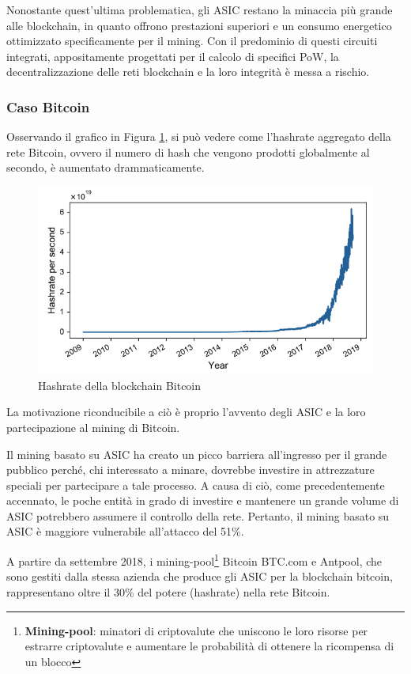 Nonostante quest'ultima problematica, gli ASIC restano la minaccia più grande alle blockchain, in quanto offrono prestazioni superiori e un consumo energetico ottimizzato specificamente per il mining. 
Con il predominio di questi circuiti integrati, appositamente progettati per il calcolo di specifici PoW, la decentralizzazione delle reti blockchain e la loro integrità è messa a rischio. 



\subsubsection{Caso Bitcoin}
Osservando il grafico in Figura \ref{fig:btc-hashrate}, si può vedere come l'hashrate aggregato della rete Bitcoin, ovvero il numero di hash che vengono prodotti globalmente al secondo, è aumentato drammaticamente.

\begin{figure}[h!]
    \centering
    \includegraphics[width=0.55\linewidth]{images/bitcoin_hashrate.png}
    \caption{Hashrate della blockchain Bitcoin \cite{asic1}}
    \label{fig:btc-hashrate}
\end{figure}

La motivazione riconducibile a ciò è proprio l'avvento degli ASIC e la loro partecipazione al mining di Bitcoin.

Il mining basato su ASIC ha creato un picco barriera all'ingresso per il grande pubblico perché, chi interessato a minare, dovrebbe investire in attrezzature speciali per partecipare a tale processo.
A causa di ciò, come precedentemente accennato, le poche entità in grado di investire e mantenere un grande volume di ASIC potrebbero assumere il controllo della rete.
Pertanto, il mining basato su ASIC è maggiore vulnerabile all'attacco del 51\%. 


A partire da settembre 2018, i mining-pool\footnote{\textbf{Mining-pool}: minatori di criptovalute che uniscono le loro risorse per estrarre criptovalute e aumentare le probabilità di ottenere la ricompensa di un blocco} Bitcoin BTC.com e Antpool, che sono gestiti dalla stessa azienda che produce gli ASIC per la blockchain bitcoin, rappresentano oltre il 30\% del potere (hashrate) nella rete Bitcoin. 
